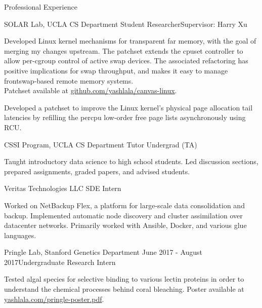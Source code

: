 \documentclass{resume} %
\begin{document}
\begin{resumeSection}{Professional Experience}
\begin{resumeSubsection}{SOLAR Lab, UCLA CS Department} 
	{}{Student Researcher}{Supervisor: Harry Xu}
\item Developed Linux kernel mechanisms for transparent far memory, 
	with the goal of merging my changes upstream. 
	The patchset extends the cpuset controller to allow per-cgroup control of
	active swap devices. The associated refactoring has positive implications
	for swap throughput, and makes it easy to manage frontswap-based remote
	memory systems. \\
	Patchset available at
	\href{https://github.com/yashlala/canvas-linux}{github.com/yashlala/canvas-linux}.
\item Developed a patchset to improve the Linux kernel's physical page
	allocation tail latencies by refilling the percpu low-order free page lists
	asynchronously using RCU. 
\end{resumeSubsection}

\begin{resumeSubsection}{CSSI Program, UCLA CS Department}
	{}{Tutor Undergrad (TA)}{}
\item Taught introductory data science to high school students. 
	Led discussion sections, prepared assignments, graded papers, and advised students. 
\end{resumeSubsection}

\begin{resumeSubsection}{Veritas Technologies LLC}
	{}{SDE Intern}{}
\item Worked on NetBackup Flex, a platform for large-scale data consolidation and backup. 
	Implemented automatic node discovery and cluster assimilation over datacenter networks. 
	Primarily worked with Ansible, Docker, and various glue languages. 
\end{resumeSubsection}

\begin{resumeSubsection}{Pringle Lab, Stanford Genetics Department}
	{June 2017 - August 2017}{Undergraduate Research Intern}{}
\item Tested algal species for selective binding to various lectin proteins in
	order to understand the chemical processes behind coral bleaching.
	Poster available at
	\href{https://yashlala.com/pringle-poster.pdf}{yashlala.com/pringle-poster.pdf}.
\end{resumeSubsection}

\end{resumeSection}
\end{document}
